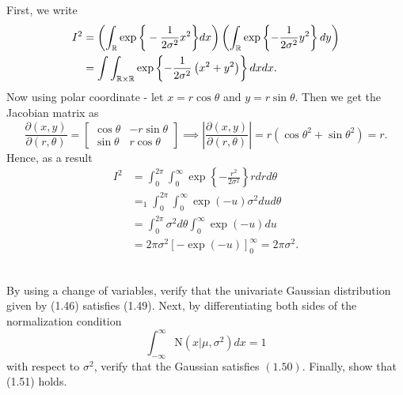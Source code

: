 First, we write 
\begin{align*}
I^{2} & =\left(\int_{\mathbb{R}}\exp\bigg\{-\frac{1}{2\sigma^{2}}x^{2}\bigg\} dx\right)\left(\int_{\mathbb{R}}\exp\left\{ -\frac{1}{2\sigma^{2}}y^{2}\right\} dy\right)\\
 & =\int\int_{\mathbb{R}\times\mathbb{R}}\exp\left\{ -\frac{1}{2\sigma^{2}}\left(x^{2}+y^{2}\right)\right\} dxdx.
\end{align*}
Now using polar coordinate - let $x=r\cos\theta$ and $y=r\sin\theta$.
Then we get the Jacobian matrix as 
\[
\frac{\partial(x,y)}{\partial(r,\theta)}=\begin{bmatrix}\cos\theta & -r\sin\theta\\
\sin\theta & r\cos\theta
\end{bmatrix}\implies\left|\frac{\partial(x,y)}{\partial(r,\theta)}\right|=r(\cos\theta^{2}+\sin\theta^{2})=r.
\]
Hence, as a result 
\begin{align*}
I^{2} & =\int_{0}^{2\pi}\int_{0}^{\infty}\exp\left\{ -\frac{r^{2}}{2\sigma^{2}}\right\} rdrd\theta\\
 & =_{1}\int_{0}^{2\pi}\int_{0}^{\infty}\exp(-u)\sigma^{2}dud\theta\\
 & =\int_{0}^{2\pi}\sigma^{2}d\theta\int_{0}^{\infty}\exp(-u)du\\
 & =2\pi\sigma^{2}\left[-\exp(-u)\right]_{0}^{\infty}=2\pi\sigma^{2}.
\end{align*}
\\
\begin{cBoxA}{}
 By using a change of variables, verify that the univariate Gaussian
distribution given by (1.46) satisfies (1.49). Next, by differentiating
both sides of the normalization condition 
\[
\int_{-\infty}^{\infty}\mathrm{N}(x\vert\mu,\sigma^{2})dx=1
\]
with respect to $\sigma^{2}$, verify that the Gaussian satisfies
$(1.50)$. Finally, show that (1.51) holds. 
\end{cBoxA}

